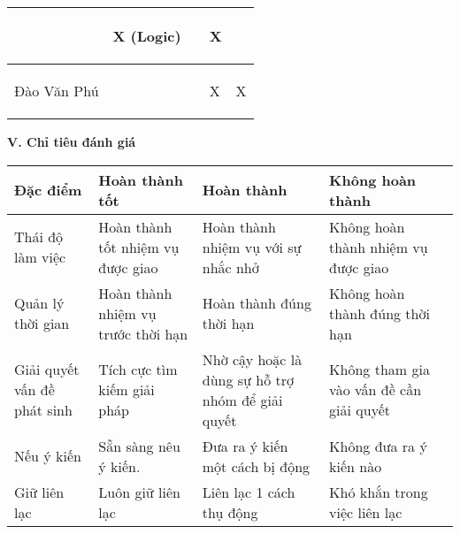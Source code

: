 \documentclass{article}
\begin{document}
\begin{flushleft}
\begin{tabular}{|>{\raggedright\arraybackslash}p{3cm}| >{\raggedright\arraybackslash}p{3cm}|
>{\raggedright\arraybackslash}p{3cm}|
>{\raggedright\arraybackslash}p{3cm}|
>{\raggedright\arraybackslash}p{3cm}|}
\begin{center}
        \end{center} & \begin{center}
            X (Logic)
        \end{center} & \begin{center}
        
        \end{center} & \begin{center}
            X
        \end{center}
        \\
    \hline
     \begin{center}
            Đào Văn Phú
        \end{center} & \begin{center}
            
        \end{center} & \begin{center}
            
        \end{center} & \begin{center}
            X
        \end{center} & \begin{center}
            X
        \end{center}
        \\
    \hline
\end{tabular}
\textbf{\large V. Chỉ tiêu đánh giá}
\begin{tabular}{|>{\raggedright\arraybackslash}p{4cm}
|>{\raggedright\arraybackslash}p{4cm}
|>{\raggedright\arraybackslash}p{4cm}
|>{\raggedright\arraybackslash}p{4cm}
|>{\raggedright\arraybackslash}p{4cm}|}
    \hline
        Đặc điểm
        & Hoàn thành tốt
        & Hoàn thành
        & Không hoàn thành\\
    \hline
        Thái độ làm việc
        & Hoàn thành tốt nhiệm vụ được giao
        & Hoàn thành nhiệm vụ với sự nhắc nhở
        & Không hoàn thành nhiệm vụ được giao\\
    \hline
        Quản lý thời gian
        & Hoàn thành nhiệm vụ trước thời hạn
        & Hoàn thành đúng thời hạn
        & Không hoàn thành đúng thời hạn
        \\
    \hline
        Giải quyết vấn đề phát sinh
        & Tích cực tìm kiếm giải pháp
        & Nhờ cậy hoặc là dùng sự hỗ trợ nhóm để giải quyết
        & Không tham gia vào vấn đề cần giải quyết
        \\
    \hline
        Nếu ý kiến
        & Sẵn sàng nêu ý kiến.
        & Đưa ra ý kiến một cách bị động
        & Không đưa ra ý kiến nào
        \\
    \hline
        Giữ liên lạc
        & Luôn giữ liên lạc
        & Liên lạc 1 cách thụ động
        & Khó khắn trong việc liên lạc
        \\
    \hline
        

\end{tabular}
\end{flushleft}
\end{document}
